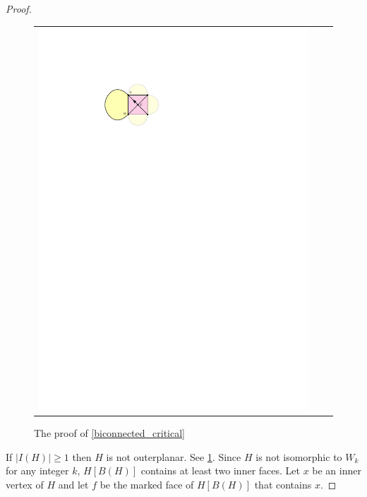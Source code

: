 \documentclass[12pt]{article}
\theoremstyle{definition}
\begin{document}
\begin{proof}
\begin{figure}
\begin{tabular}{ccc}
      \includegraphics[page=3]{figs/biconnected}
    \end{tabular}
    \caption{The proof of \cref{biconnected_critical}}
    \label{contraction_proof}
  \end{figure}
  If $|I(H)|\ge 1$ then $H$ is not outerplanar.  See \cref{contraction_proof}.  Since $H$ is not isomorphic to $W_k$ for any integer $k$, $H[B(H)]$ contains at least two inner faces.  Let $x$ be an inner vertex of $H$ and let $f$ be the marked face of $H[B(H)]$ that contains $x$.

\end{proof}
\end{document}
